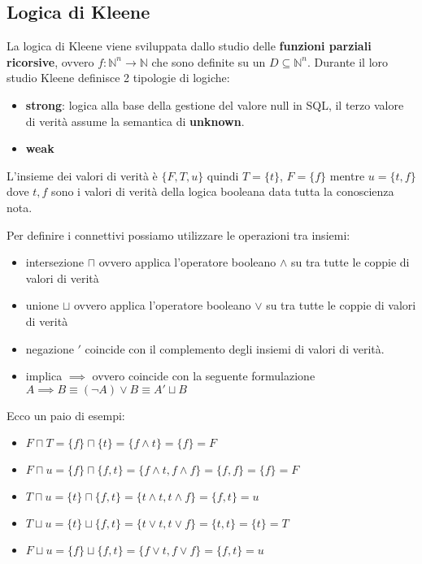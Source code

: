 \subsection{Logica di Kleene}
La logica di Kleene viene sviluppata dallo studio delle \textbf{funzioni parziali ricorsive},
ovvero $f:\mathbb{N}^n\to \mathbb{N}$ che sono definite su un $D\subseteq \mathbb{N}^n$.
Durante il loro studio Kleene definisce 2 tipologie di logiche:
\begin{itemize}
    \item \textbf{strong}: logica alla base della gestione del valore null in SQL,
    il terzo valore di verità assume la semantica di \textbf{unknown}.
    \item \textbf{weak}
\end{itemize} 

L'insieme dei valori di verità è $\{F,T,u\}$  quindi $T=\{t\}$, $F=\{f\}$
mentre $u=\{t,f\}$ dove $t,f$ sono i valori di verità della logica booleana data 
tutta la conoscienza nota.

Per definire i connettivi possiamo utilizzare le operazioni tra insiemi:
\begin{itemize}
    \item intersezione $\sqcap$ ovvero applica l'operatore booleano $\land$ su 
    tra tutte le coppie di valori di verità
    \item unione $\sqcup$ ovvero applica l'operatore booleano $\lor$ su 
    tra tutte le coppie di valori di verità
    \item negazione $'$ coincide con il complemento degli insiemi di valori di verità.
    \item implica $\implies$ ovvero coincide con la seguente formulazione 
    $A \implies B \equiv (\lnot A) \lor B \equiv A' \sqcup B $
\end{itemize}

\begin{esempio}
    Ecco un paio di esempi:
    \begin{itemize}
        \item $F\sqcap T = \{f\} \sqcap \{t\} = \{f\land t\} = \{f\} = F$ 
        \item $F\sqcap u = \{f\} \sqcap \{f,t\} = \{f\land t, f\land f\} = \{f, f\} =\{f\}= F$
        \item $T\sqcap u = \{t\} \sqcap \{f,t\} = \{t\land t, t\land f\} = \{f,t\} = u$
        \item $T\sqcup u = \{t\} \sqcup \{f,t\} = \{t\lor t, t\lor f\} = \{t,t\}= \{t\}= T$
        \item $F\sqcup u = \{f\} \sqcup \{f,t\} = \{f\lor t, f\lor f\} = \{f,t\}= u$
    \end{itemize}
\end{esempio}

